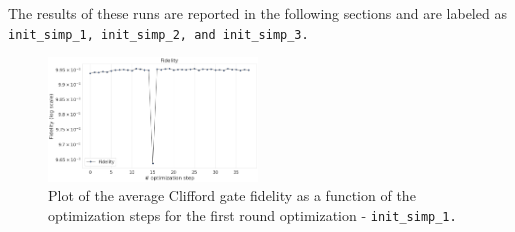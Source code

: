The results of these runs are reported in the following sections and are labeled as \tt{init\_simp\_1}, \tt{init\_simp\_2}, and \tt{init\_simp\_3}.

\begin{figure}[h!]
    \centering
    \includegraphics[width=0.495\textwidth]{figures/png/RB_optimization/NM/InitialSymplex/20241110_211211/fidelity.png}
    \caption{Plot of the average Clifford gate fidelity as a function of the optimization steps for the first round optimization - \tt{init\_simp\_1}.}
    \label{fig:20241110_211211:fidelity}
\end{figure}

